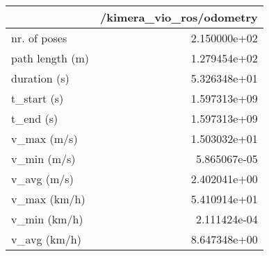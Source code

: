 \begin{tabular}{lr}
\toprule
{} &  /kimera\_vio\_ros/odometry \\
\midrule
nr. of poses    &              2.150000e+02 \\
path length (m) &              1.279454e+02 \\
duration (s)    &              5.326348e+01 \\
t\_start (s)     &              1.597313e+09 \\
t\_end (s)       &              1.597313e+09 \\
v\_max (m/s)     &              1.503032e+01 \\
v\_min (m/s)     &              5.865067e-05 \\
v\_avg (m/s)     &              2.402041e+00 \\
v\_max (km/h)    &              5.410914e+01 \\
v\_min (km/h)    &              2.111424e-04 \\
v\_avg (km/h)    &              8.647348e+00 \\
\bottomrule
\end{tabular}

